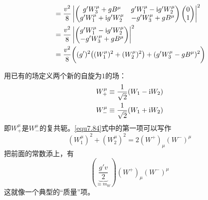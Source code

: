 \begin{equation}
\begin{aligned}
& = \frac{v^2}{8} \left|\begin{pmatrix}
g'W_3^\mu+gB^\mu & g'W_1^\mu-\mathrm i g'W_2^\mu \\ g'W_1^\mu+\mathrm i g'W_2^\mu & -g'W_3^\mu+gB^\mu
\end{pmatrix}\begin{pmatrix} 0 \\ 1 \end{pmatrix}\right|^2 \\
& = \frac{v^2}{8} \left|\begin{pmatrix}
g'W_1^\mu-\mathrm i g'W_2^\mu \\  -g'W_3^\mu+gB^\mu
\end{pmatrix}\right|^2 \\
& = \frac{v^2}{8} \bigg( (g')^2 \big((W_1^\mu)^2+ (W_2^\mu)^2 \big) +  (g'W_3^\mu-gB^\mu)^2 \bigg)
\end{aligned}
\label{equ7.84}
\end{equation}

用已有的场定义两个新的自旋为$1$的场：
\begin{align}
\label{equ7.85}
W_+^\mu &\equiv \frac{1}{\sqrt{2}}(W_1-\mathrm i W_2) \\
\label{equ7.86}
W_-^\mu &\equiv \frac{1}{\sqrt{2}}(W_1+\mathrm i W_2)
\end{align}
即$W_+^\mu$是$W_-^\mu$的复共轭。\ref{equ7.84}式中的第一项可以写作
\begin{equation}
\label{equ7.87}
(W_1^\mu)^2+ (W_2^\mu)^2 = 2 (W^+)_\mu(W^-)^\mu
\end{equation}
把前面的常数添上，有
\begin{equation}
\label{equ7.88}
\left(\underbrace{\frac{g'v}{2}}_{\equiv m_W}\right)(W^+)_\mu(W^-)^\mu
\end{equation}
这就像一个典型的“质量”项。

